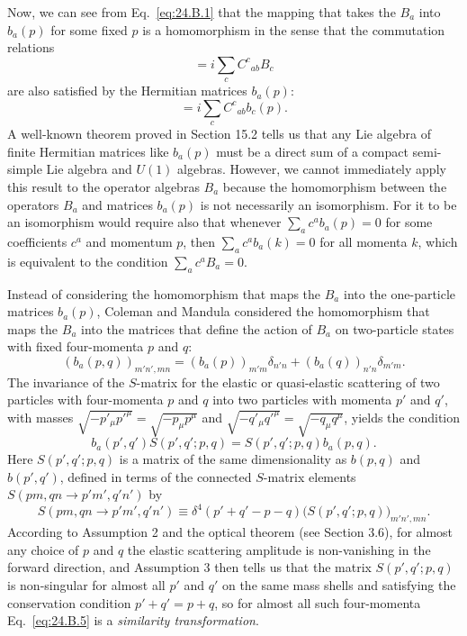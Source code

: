 Now, we can see from Eq.~\eqref{eq:24.B.1} that the mapping that takes the
$B_a$ into $b_a(p)$ for some fixed $p$ is a homomorphism in the sense
that the commutation relations
\begin{equation}
 [B_a,B_b]
 =i\sum_c C^c{}_{ab}B_c
\tag{24.B.2}\label{eq:24.B.2}
\end{equation}
are also satisfied by the Hermitian matrices $b_a(p)$:
\begin{equation}
 [b_a(p),b_b(p)]
 =i\sum_c C^c{}_{ab}b_c(p).
\tag{24.B.3}\label{eq:24.B.3}
\end{equation}
A well-known theorem proved in Section 15.2 tells us that any Lie algebra of
finite Hermitian matrices like $b_a(p)$ must be a direct sum of a compact
semi-simple Lie algebra and $U(1)$ algebras. However, we cannot immediately
apply this result to the operator algebras $B_a$ because the homomorphism
between the operators $B_a$ and matrices $b_a(p)$ is not necessarily
an isomorphism. For it to be an isomorphism would require also that whenever
$\sum_a c^a b_a(p)=0$ for some coefficients $c^a$ and
momentum $p$, then $\sum_a c^a b_a(k)=0$ for all momenta $k$,
which is equivalent to the condition $\sum_a c^a B_a=0$.

Instead of considering the homomorphism that maps the $B_a$ into the
one-particle matrices $b_a(p)$, Coleman and Mandula considered the
homomorphism that maps the $B_a$ into the matrices that define the action
of $B_a$ on two-particle states with fixed four-momenta $p$ and $q$:
\begin{equation}
 (b_a(p,q))_{m'n',mn}
 =(b_a(p))_{m'm}\delta_{n'n}
 +(b_a(q))_{n'n}\delta_{m'm}.
\tag{24.B.4}\label{eq:24.B.4}
\end{equation}
The invariance of the $S$-matrix for the elastic or quasi-elastic scattering
of two particles with four-momenta $p$ and $q$ into two particles with momenta
$p'$ and $q'$, with masses
$\sqrt{-p'_\mu p'^\mu}=\sqrt{-p_\mu p^\mu}$ and
$\sqrt{-q'_\mu q'^\mu}=\sqrt{-q_\mu q^\mu}$, yields the condition
\begin{equation}
 b_a(p',q')S(p',q';p,q)
 =S(p',q';p,q)b_a(p,q).
\tag{24.B.5}\label{eq:24.B.5}
\end{equation}
Here $S(p',q';p,q)$ is a matrix of the same dimensionality as $b(p,q)$ and
$b(p',q')$, defined in terms of the connected $S$-matrix elements
$S(pm,qn\mathbin{\to}p'm',q'n')$ by
\begin{equation}
 S(pm,qn\mathbin{\to}p'm',q'n')
 \equiv\delta^4(p'+q'-p-q)
 \bigl(S(p',q';p,q)\bigr)_{m'n',mn}.
\tag{24.B.6}\label{eq:24.B.6}
\end{equation}
According to Assumption 2 and the optical theorem (see Section 3.6), for almost
any choice of $p$ and $q$ the elastic scattering amplitude is non-vanishing in
the forward direction, and Assumption 3 then tells us that the matrix
$S(p',q';p,q)$ is non-singular for almost all $p'$ and $q'$ on the same mass
shells and satisfying the conservation condition $p'+q'=p+q$, so for almost
all such four-momenta Eq.~\eqref{eq:24.B.5} is a \emph{similarity
transformation}.

